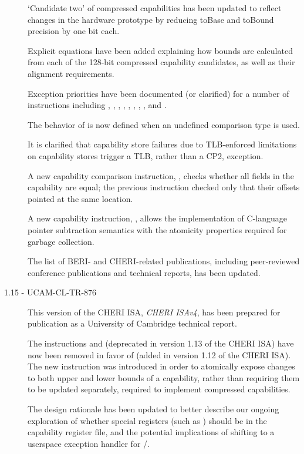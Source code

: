 \begin{description}
  `Candidate two' of compressed capabilities has been updated to reflect
  changes in the hardware prototype by reducing toBase and toBound precision
  by one bit each.

  Explicit equations have been added explaining how bounds are calculated
  from each of the 128-bit compressed capability candidates, as well as their
  alignment requirements.

  Exception priorities have been documented (or clarified) for a number of
  instructions including , ,
  , , ,
  , , , and
  .

  The behavior of  is now defined when an undefined
  comparison type is used.

  It is clarified that capability store failures due to TLB-enforced
  limitations on capability stores trigger a TLB, rather than a CP2,
  exception.

  A new capability comparison instruction, , checks
  whether all fields in the capability are equal; the previous
   instruction checked only that their offsets pointed at the
  same location.

  A new capability instruction, , allows the implementation
  of C-language pointer subtraction semantics with the atomicity properties
  required for garbage collection.

  The list of BERI- and CHERI-related publications, including peer-reviewed
  conference publications and technical reports, has been updated.

\item[1.15 - UCAM-CL-TR-876]
  This version of the CHERI ISA, \textit{CHERI ISAv4}, has been prepared for
  publication as a University of Cambridge technical report.

  The instructions  and 
  (deprecated in version 1.13 of the CHERI ISA) have now been removed in favor
  of  (added in version 1.12 of the CHERI ISA).
  The new instruction was introduced in order to atomically expose changes to
  both upper and lower bounds of a capability, rather than requiring them to
  be updated separately, required to implement compressed capabilities.

  The design rationale has been updated to better describe our ongoing
  exploration of whether special registers (such as \KCC{}) should be in the
  capability register file, and the potential implications of shifting to a
  userspace exception handler for /.


\end{description}

